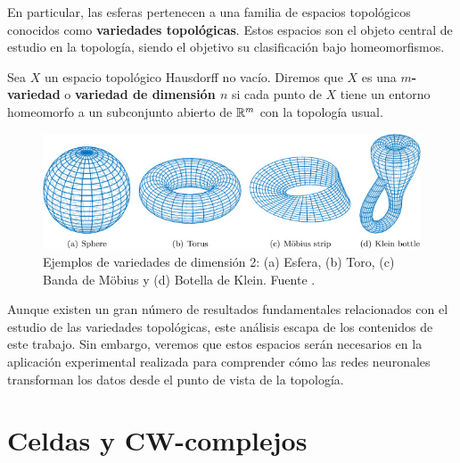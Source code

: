 En particular, las esferas pertenecen a una familia de espacios topológicos conocidos como \textbf{variedades topológicas}. Estos espacios son el objeto central de estudio en la topología, siendo el objetivo su clasificación bajo homeomorfismos.

\begin{definicion}
	Sea \(X\) un espacio topológico Hausdorff no vacío. Diremos que \(X\) es una \textbf{\(m\)-variedad} o \textbf{variedad de dimensión $n$}
	si cada punto de \(X\) tiene un entorno homeomorfo a un subconjunto abierto de \(\mathbb{R}^m\) con la 
	topología usual.%
\end{definicion}

\begin{figure}[h]
	\centering
	\includegraphics[width=120mm]{img/manifolds.jpg}
	\caption{Ejemplos de variedades de dimensión 2: (a) Esfera, (b) Toro, (c) Banda de Möbius y (d) Botella de Klein. Fuente \cite{deng2020topology}.}
\end{figure}

Aunque existen un gran número de resultados fundamentales relacionados con el estudio de las variedades topológicas, este análisis escapa de los contenidos de este trabajo. Sin embargo, veremos que estos espacios serán necesarios en la aplicación experimental realizada para comprender cómo las redes neuronales transforman los datos desde el punto de vista de la topología.

\section{Celdas y CW-complejos}

